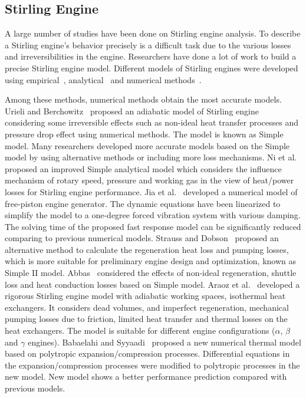 \subsection{Stirling Engine}\label{sec:se}

A large number of studies have been done on Stirling engine analysis. To describe a Stirling engine's behavior precisely is a difficult task due to the various losses and irreversibilities in the engine.
Researchers have done a lot of work to build a precise Stirling engine model. Different models of Stirling engines were developed using empirical~\cite{Senft1998,Costea1999,Prieto2003,Organ2013,Kongtragool2005,Thombare2008}, analytical~\cite{Ohtomo1995,Rogdakis2004,Kongtragool2006,Puech2011,Formosa2010,Shazly2014,Cullen2011,Ahmadi2013,Ahmadi2013b,Tursunbaev2007} and numerical methods~\cite{Urieli1984,Ni2016,Jia2016,Strauss2010,Abbas2014,Araoz2015,Babaelahi2015,Barreto2017,Wu1998,Li2011,Hosseinzade2015}.

Among these methods, numerical methods obtain the most accurate models. Urieli and Berchowitz~\cite{Urieli1984} proposed an adiabatic model of Stirling engine considering some irreversible effects such as non-ideal heat transfer processes and pressure drop effect using numerical methods. The model is known as Simple model. Many researchers developed more accurate models based on the Simple model by using alternative methods or including more loss mechanisms.
Ni et al.~\cite{Ni2016} proposed an improved Simple analytical model which considers the influence mechanism of rotary speed, pressure and working gas in the view of heat/power losses for Stirling engine performance.
Jia et al.~\cite{Jia2016} developed a numerical model of free-piston engine generator. The dynamic equations have been linearized to simplify the model to a one-degree forced vibration system with various damping. The solving time of the proposed fast response model can be significantly reduced comparing to previous numerical models.
Strauss and Dobson~\cite{Strauss2010} proposed an alternative method to calculate the regeneration heat loss and pumping losses, which is more suitable for preliminary engine design and optimization, known as Simple II model.
Abbas~\cite{Abbas2014} considered the effects of non-ideal regeneration, shuttle loss and heat conduction losses based on Simple model.
Araoz et al.~\cite{Araoz2015} developed a rigorous Stirling engine model with adiabatic working spaces, isothermal heat exchangers. It considers dead volumes, and imperfect regeneration, mechanical pumping losses due to friction, limited heat transfer and thermal losses on the heat exchangers. The model is suitable for different engine configurations ($\alpha$, $\beta$ and $\gamma$ engines).
Babaelahi and Syyaadi~\cite{Babaelahi2015} proposed a new numerical thermal model based on polytropic expansion/compression processes. Differential equations in the expansion/compression processes were modified to polytropic processes in the new model. New model shows a better performance prediction compared with previous models.


